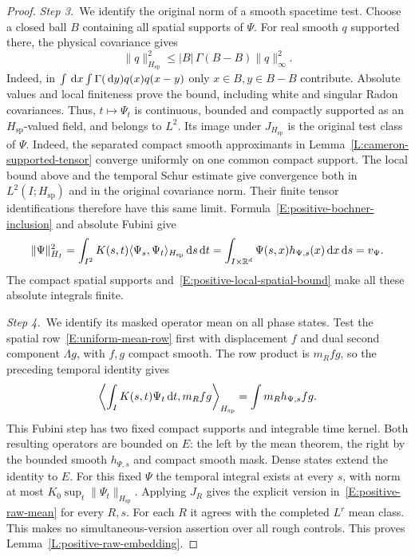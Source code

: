 \begin{proof}
  \medskip
  \noindent\textit{Step 3.~}We identify the original norm of a smooth
  spacetime test.
  Choose a closed ball $B$ containing all spatial supports of $\Psi$. For real
  smooth $q$ supported there, the physical covariance gives
  \begin{equation}\label{E:positive-local-spatial-bound}
    \|q\|_{H_{\mathrm{sp}}}^2
    \le |B|\,\Gamma(B-B)\|q\|_\infty^2.
  \end{equation}
  Indeed, in $\int\,\mathrm{d} x\int\Gamma(\,\mathrm{d} y)q(x)q(x-y)$ only $x \in B,y \in B-B$
  contribute. Absolute values and local finiteness prove the bound, including
  white and singular Radon covariances. Thus, $t\mapsto\Psi_t$ is continuous,
  bounded and compactly supported as an $H_{\mathrm{sp}}$-valued field, and
  belongs to $L^2$. Its image under $J_{H_{\mathrm{sp}}}$ is the original test
  class of $\Psi$. Indeed, the separated compact smooth approximants in
  Lemma~\ref{L:cameron-supported-tensor} converge uniformly on one common
  compact support. The local bound above and the temporal Schur estimate give
  convergence both in $L^2(I;H_{\mathrm{sp}})$ and in the original covariance
  norm. Their finite tensor identifications therefore have this same limit.
  Formula~\eqref{E:positive-bochner-inclusion} and absolute Fubini give
  \[
    \|\Psi\|_{H_I}^2
    =\int_{I^2}K(s,t)\langle\Psi_s,\Psi_t\rangle_{H_{\mathrm{sp}}}
    \,\mathrm{d} s\,\mathrm{d} t
    =\int_{I\times\mathbb{R}^d}\Psi(s,x)h_{\Psi,s}(x)\,\mathrm{d} x\,\mathrm{d} s=v_\Psi.
  \]
  The compact spatial supports and~\eqref{E:positive-local-spatial-bound} make
  all these absolute integrals finite.


  \medskip
  \noindent\textit{Step 4.~}We identify its masked operator mean on all phase
  states.
  Test the spatial row~\eqref{E:uniform-mean-row} first with displacement $f$
  and dual second component $\Lambda g$, with $f,g$ compact smooth. The row
  product is $m_Rfg$, so the preceding temporal identity gives
  \[
    \left\langle\int_IK(s,t)\Psi_t\,\mathrm{d} t,m_Rfg\right\rangle_{H_{\mathrm{sp}}}
    =\int m_Rh_{\Psi,s}fg .
  \]
  This Fubini step has two fixed compact supports and integrable time kernel.
  Both resulting operators are bounded on $E$: the left by the mean theorem, the
  right by the bounded smooth $h_{\Psi,s}$ and compact smooth mask. Dense states
  extend the identity to $E$. For this fixed $\Psi$ the temporal integral exists
  at every $s$, with norm at most $K_0\sup_t\|\Psi_t\|_{H_{\mathrm{sp}}}$.
  Applying $J_R$ gives the explicit version in~\eqref{E:positive-raw-mean} for
  every $R,s$. For each $R$ it agrees with the completed $L^r$ mean class. This
  makes no simultaneous-version assertion over all rough controls. This proves
  Lemma~\ref{L:positive-raw-embedding}.
\end{proof}

